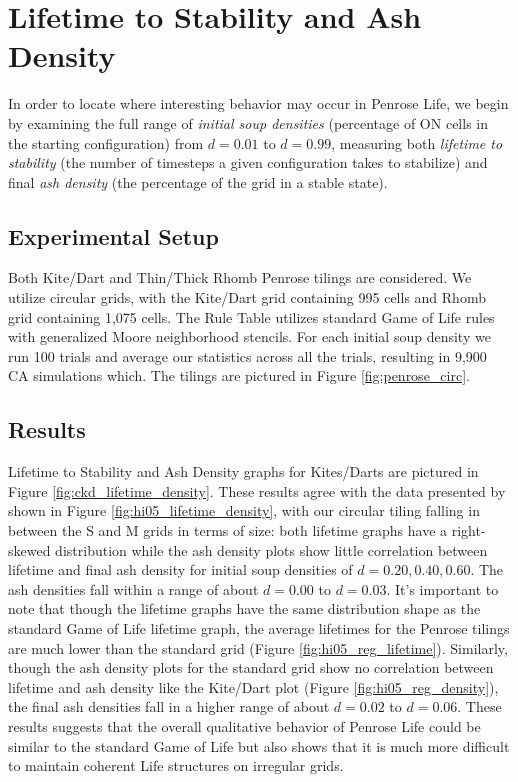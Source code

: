 \documentclass[a4paper,11pt,twoside]{report}
\begin{document}
\section{Lifetime to Stability and Ash Density}
\label{ch4:lifetime}
In order to locate where interesting behavior may occur in Penrose Life, we begin by examining the full range of \textit{initial soup densities} (percentage of ON cells in the starting configuration) from $d=0.01$ to $d=0.99$, measuring both \textit{lifetime to stability} (the number of timesteps a given configuration takes to stabilize) and final \textit{ash density} (the percentage of the grid in a stable state).

\subsection*{Experimental Setup}
Both Kite/Dart and Thin/Thick Rhomb Penrose tilings are considered. We utilize circular grids, with the Kite/Dart grid containing 995 cells and Rhomb grid containing 1,075 cells. The Rule Table utilizes standard Game of Life rules with generalized Moore neighborhood stencils. For each initial soup density we run 100 trials and average our statistics across all the trials, resulting in 9,900 CA simulations which. The tilings are pictured in Figure \ref{fig:penrose_circ}.

\subsection*{Results}
Lifetime to Stability and Ash Density graphs for Kites/Darts are pictured in Figure \ref{fig:ckd_lifetime_density}. These results agree with the data presented by \citeauthor{hi05} shown in Figure \ref{fig:hi05_lifetime_density}, with our circular tiling falling in between the S and M grids in terms of size: both lifetime graphs have a right-skewed distribution while the ash density plots show little correlation between lifetime and final ash density for initial soup densities of $d=0.20, 0.40, 0.60$. The ash densities fall within a range of about $d=0.00$ to $d=0.03$. It's important to note that though the lifetime graphs have the same distribution shape as the standard Game of Life lifetime graph, the average lifetimes for the Penrose tilings are much lower than the standard grid (Figure \ref{fig:hi05_reg_lifetime}). Similarly, though the ash density plots for the standard grid show no correlation between lifetime and ash density like the Kite/Dart plot (Figure \ref{fig:hi05_reg_density}), the final ash densities fall in a higher range of about $d=0.02$ to $d=0.06$. These results suggests that the overall qualitative behavior of Penrose Life could be similar to the standard Game of Life but also shows that it is much more difficult to maintain coherent Life structures on irregular grids.
\end{document}
